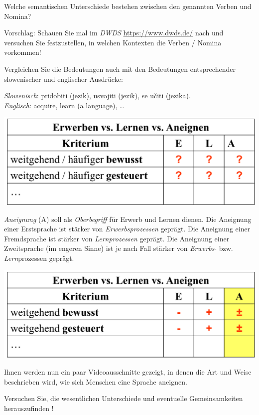 \documentclass[
  letterpaper,
]{scrbook}
\begin{document}
Welche semantischen Unterschiede bestehen zwischen den genannten Verben
und Nomina?

Vorschlag: Schauen Sie mal im \emph{DWDS} \url{https://www.dwds.de/}
nach und versuchen Sie festzustellen, in welchen Kontexten die Verben /
Nomina vorkommen!

Vergleichen Sie die Bedeutungen auch mit den Bedeutungen entsprechender
slowenischer und englischer Ausdrücke:

\emph{Slowenisch}: pridobiti (jezik), usvojiti (jezik), se učiti
(jezika).\\
\emph{Englisch}: acquire, learn (a language), \ldots{}

\includegraphics[width=8.62in,height=\textheight]{./pictures/termini_verben_nomen.png}

\emph{Aneignung} (A) soll als \emph{Oberbegriff} für Erwerb und Lernen
dienen. Die Aneignung einer Erstsprache ist stärker von
\emph{Erwerbsprozessen} geprägt. Die Aneignung einer Fremdsprache ist
stärker von \emph{Lernprozessen} geprägt. Die Aneignung einer
Zweitsprache (im engeren Sinne) ist je nach Fall stärker von
\emph{Erwerbs}- bzw. \emph{Lern}prozessen geprägt.

\includegraphics[width=8.62in,height=\textheight]{./pictures/termini_verben_nomen2.png}

Ihnen werden nun ein paar Videoausschnitte gezeigt, in denen die Art und
Weise beschrieben wird, wie sich Menschen eine Sprache aneignen.

Versuchen Sie, die wesentlichen Unterschiede und eventuelle
Gemeinsamkeiten herauszufinden !
\end{document}

